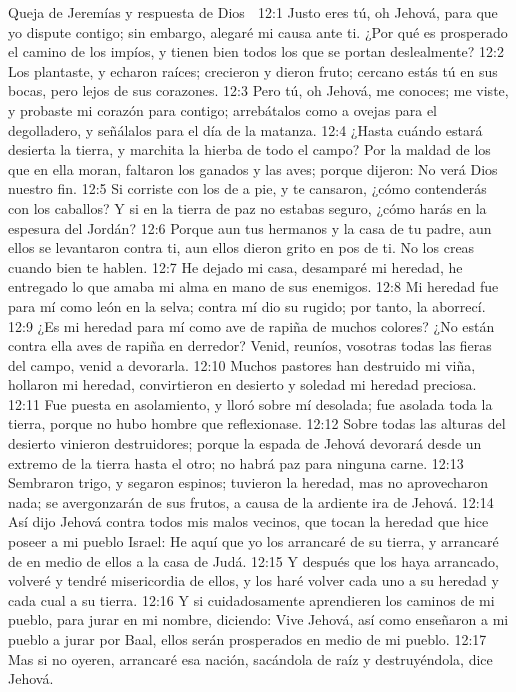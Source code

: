 Queja de Jeremías y respuesta de Dios  

12:1 Justo eres tú, oh Jehová, para que yo dispute contigo; sin embargo, alegaré mi causa ante ti. ¿Por qué es prosperado el camino de los impíos, y tienen bien todos los que se portan deslealmente?  
12:2 Los plantaste, y echaron raíces; crecieron y dieron fruto; cercano estás tú en sus bocas, pero lejos de sus corazones.  
12:3 Pero tú, oh Jehová, me conoces; me viste, y probaste mi corazón para contigo; arrebátalos como a ovejas para el degolladero, y señálalos para el día de la matanza.  
12:4 ¿Hasta cuándo estará desierta la tierra, y marchita la hierba de todo el campo? Por la maldad de los que en ella moran, faltaron los ganados y las aves; porque dijeron: No verá Dios nuestro fin.  
12:5 Si corriste con los de a pie, y te cansaron, ¿cómo contenderás con los caballos? Y si en la tierra de paz no estabas seguro, ¿cómo harás en la espesura del Jordán?  
12:6 Porque aun tus hermanos y la casa de tu padre, aun ellos se levantaron contra ti, aun ellos dieron grito en pos de ti. No los creas cuando bien te hablen.  
12:7 He dejado mi casa, desamparé mi heredad, he entregado lo que amaba mi alma en mano de sus enemigos.  
12:8 Mi heredad fue para mí como león en la selva; contra mí dio su rugido; por tanto, la aborrecí.  
12:9 ¿Es mi heredad para mí como ave de rapiña de muchos colores? ¿No están contra ella aves de rapiña en derredor? Venid, reuníos, vosotras todas las fieras del campo, venid a devorarla.  
12:10 Muchos pastores han destruido mi viña, hollaron mi heredad, convirtieron en desierto y soledad mi heredad preciosa.  
12:11 Fue puesta en asolamiento, y lloró sobre mí desolada; fue asolada toda la tierra, porque no hubo hombre que reflexionase.  
12:12 Sobre todas las alturas del desierto vinieron destruidores; porque la espada de Jehová devorará desde un extremo de la tierra hasta el otro; no habrá paz para ninguna carne.  
12:13 Sembraron trigo, y segaron espinos; tuvieron la heredad, mas no aprovecharon nada; se avergonzarán de sus frutos, a causa de la ardiente ira de Jehová.  
12:14 Así dijo Jehová contra todos mis malos vecinos, que tocan la heredad que hice poseer a mi pueblo Israel: He aquí que yo los arrancaré de su tierra, y arrancaré de en medio de ellos a la casa de Judá.  
12:15 Y después que los haya arrancado, volveré y tendré misericordia de ellos, y los haré volver cada uno a su heredad y cada cual a su tierra.  
12:16 Y si cuidadosamente aprendieren los caminos de mi pueblo, para jurar en mi nombre, diciendo: Vive Jehová, así como enseñaron a mi pueblo a jurar por Baal, ellos serán prosperados en medio de mi pueblo.  
12:17 Mas si no oyeren, arrancaré esa nación, sacándola de raíz y destruyéndola, dice Jehová.  

